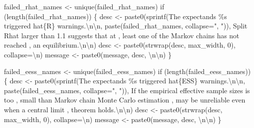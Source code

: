 \documentclass[
  letterpaper,
  DIV=11,
  numbers=noendperiod]{scrartcl}
\newenvironment{Shaded}{\begin{snugshade}}{\end{snugshade}}
\newcommand{\AttributeTok}[1]{\textcolor[rgb]{0.40,0.45,0.13}{#1}}
\newcommand{\ControlFlowTok}[1]{\textcolor[rgb]{0.00,0.23,0.31}{#1}}
\newcommand{\DecValTok}[1]{\textcolor[rgb]{0.68,0.00,0.00}{#1}}
\newcommand{\FunctionTok}[1]{\textcolor[rgb]{0.28,0.35,0.67}{#1}}
\newcommand{\NormalTok}[1]{\textcolor[rgb]{0.00,0.23,0.31}{#1}}
\newcommand{\OtherTok}[1]{\textcolor[rgb]{0.00,0.23,0.31}{#1}}
\newcommand{\SpecialCharTok}[1]{\textcolor[rgb]{0.37,0.37,0.37}{#1}}
\newcommand{\StringTok}[1]{\textcolor[rgb]{0.13,0.47,0.30}{#1}}
\begin{document}
\begin{Shaded}
\begin{Highlighting}[]
\NormalTok{  failed\_rhat\_names }\OtherTok{\textless{}{-}} \FunctionTok{unique}\NormalTok{(failed\_rhat\_names)}
  \ControlFlowTok{if}\NormalTok{ (}\FunctionTok{length}\NormalTok{(failed\_rhat\_names)) \{}
\NormalTok{    desc }\OtherTok{\textless{}{-}} 
      \FunctionTok{paste0}\NormalTok{(}\FunctionTok{sprintf}\NormalTok{(}\StringTok{\textquotesingle{}The expectands \%s triggered hat\{R\} warnings.}\SpecialCharTok{\textbackslash{}n\textbackslash{}n}\StringTok{\textquotesingle{}}\NormalTok{,}
             \FunctionTok{paste}\NormalTok{(failed\_rhat\_names, }\AttributeTok{collapse=}\StringTok{", "}\NormalTok{)),}
             \StringTok{\textquotesingle{}  Split Rhat larger than 1.1 suggests that at \textquotesingle{}}\NormalTok{,}
             \StringTok{\textquotesingle{}least one of the Markov chains has not reached \textquotesingle{}}\NormalTok{,}
             \StringTok{\textquotesingle{}an equilibrium.}\SpecialCharTok{\textbackslash{}n\textbackslash{}n}\StringTok{\textquotesingle{}}\NormalTok{)}
\NormalTok{    desc }\OtherTok{\textless{}{-}} \FunctionTok{paste0}\NormalTok{(}\FunctionTok{strwrap}\NormalTok{(desc, max\_width, }\DecValTok{0}\NormalTok{), }\AttributeTok{collapse=}\StringTok{\textquotesingle{}}\SpecialCharTok{\textbackslash{}n}\StringTok{\textquotesingle{}}\NormalTok{)}
\NormalTok{    message }\OtherTok{\textless{}{-}} \FunctionTok{paste0}\NormalTok{(message, desc, }\StringTok{\textquotesingle{}}\SpecialCharTok{\textbackslash{}n\textbackslash{}n}\StringTok{\textquotesingle{}}\NormalTok{)}
\NormalTok{  \}}
  
\NormalTok{  failed\_eess\_names }\OtherTok{\textless{}{-}} \FunctionTok{unique}\NormalTok{(failed\_eess\_names)}
  \ControlFlowTok{if}\NormalTok{ (}\FunctionTok{length}\NormalTok{(failed\_eess\_names)) \{}
\NormalTok{    desc }\OtherTok{\textless{}{-}} 
      \FunctionTok{paste0}\NormalTok{(}\FunctionTok{sprintf}\NormalTok{(}\StringTok{\textquotesingle{}The expectands \%s triggered hat\{ESS\} warnings.}\SpecialCharTok{\textbackslash{}n\textbackslash{}n}\StringTok{\textquotesingle{}}\NormalTok{,}
             \FunctionTok{paste}\NormalTok{(failed\_eess\_names, }\AttributeTok{collapse=}\StringTok{", "}\NormalTok{)),}
             \StringTok{\textquotesingle{}  If the empirical effective sample sizes is too \textquotesingle{}}\NormalTok{,}
             \StringTok{\textquotesingle{}small than Markov chain Monte Carlo estimation \textquotesingle{}}\NormalTok{,}
             \StringTok{\textquotesingle{}may be unreliable even when a central limit \textquotesingle{}}\NormalTok{,}
             \StringTok{\textquotesingle{}theorem holds.}\SpecialCharTok{\textbackslash{}n\textbackslash{}n}\StringTok{\textquotesingle{}}\NormalTok{)}
\NormalTok{    desc }\OtherTok{\textless{}{-}} \FunctionTok{paste0}\NormalTok{(}\FunctionTok{strwrap}\NormalTok{(desc, max\_width, }\DecValTok{0}\NormalTok{), }\AttributeTok{collapse=}\StringTok{\textquotesingle{}}\SpecialCharTok{\textbackslash{}n}\StringTok{\textquotesingle{}}\NormalTok{)}
\NormalTok{    message }\OtherTok{\textless{}{-}} \FunctionTok{paste0}\NormalTok{(message, desc, }\StringTok{\textquotesingle{}}\SpecialCharTok{\textbackslash{}n\textbackslash{}n}\StringTok{\textquotesingle{}}\NormalTok{)}
\NormalTok{  \}}
  

\end{Highlighting}
\end{Shaded}
\end{document}
